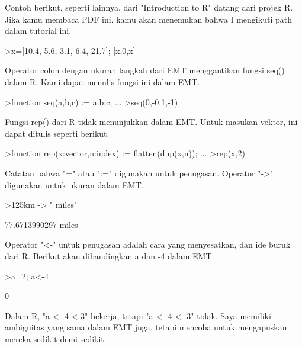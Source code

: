 \documentclass[a4paper,10pt]{article}
\begin{document}
\begin{eulernotebook}
\begin{eulercomment}
\begin{eulercomment}
\begin{eulercomment}
\begin{eulercomment}
\begin{eulercomment}
Contoh berikut, seperti lainnya, dari "Introduction to R" datang dari
projek R. Jika kamu membaca PDF ini, kamu akan menemukan bahwa I
mengikuti path dalam tutorial ini.
\end{eulercomment}
\begin{eulerprompt}
>x=[10.4, 5.6, 3.1, 6.4, 21.7]; [x,0,x]
\end{eulerprompt}
\begin{euleroutput}
  [10.4,  5.6,  3.1,  6.4,  21.7,  0,  10.4,  5.6,  3.1,  6.4,  21.7]
\end{euleroutput}
\begin{eulercomment}
Operator colon dengan ukuran langkah dari EMT menggantikan fungsi
seq() dalam R. Kami dapat menulis fungsi ini dalam EMT.
\end{eulercomment}
\begin{eulerprompt}
>function seq(a,b,c) := a:b:c; ...
>seq(0,-0.1,-1)
\end{eulerprompt}
\begin{euleroutput}
  [0,  -0.1,  -0.2,  -0.3,  -0.4,  -0.5,  -0.6,  -0.7,  -0.8,  -0.9,  -1]
\end{euleroutput}
\begin{eulercomment}
Fungsi rep() dari R tidak menunjukkan dalam EMT. Untuk masukan vektor,
ini dapat ditulis seperti berikut.
\end{eulercomment}
\begin{eulerprompt}
>function rep(x:vector,n:index) := flatten(dup(x,n)); ...
>rep(x,2)
\end{eulerprompt}
\begin{euleroutput}
  [10.4,  5.6,  3.1,  6.4,  21.7,  10.4,  5.6,  3.1,  6.4,  21.7]
\end{euleroutput}
\begin{eulercomment}
Catatan bahwa "=" atau ":=" digunakan untuk penugasan. Operator "-\textgreater{}"
digunakan untuk ukuran dalam EMT.
\end{eulercomment}
\begin{eulerprompt}
>125km -> " miles"
\end{eulerprompt}
\begin{euleroutput}
  77.6713990297 miles
\end{euleroutput}
\begin{eulercomment}
Operator "\textless{}-" untuk penugasan adalah cara yang menyesatkan, dan ide
buruk dari R. Berikut akan dibandingkan a dan -4 dalam EMT.
\end{eulercomment}
\begin{eulerprompt}
>a=2; a<-4
\end{eulerprompt}
\begin{euleroutput}
  0
\end{euleroutput}
\begin{eulercomment}
Dalam R, "a \textless{} -4 \textless{} 3" bekerja, tetapi "a \textless{} -4 \textless{} -3" tidak. Saya
memiliki ambiguitas yang sama dalam EMT juga, tetapi mencoba untuk
mengapuskan mereka sedikit demi sedikit.


\end{eulercomment}
\end{eulercomment}
\end{eulercomment}
\end{eulercomment}
\end{eulercomment}
\end{eulernotebook}
\end{document}
